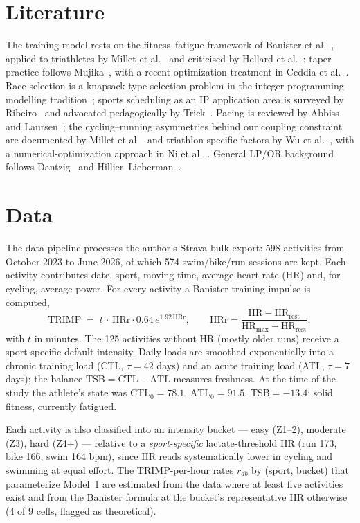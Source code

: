 \documentclass[11pt,a4paper]{article}
\begin{document}
\section{Literature}

The training model rests on the fitness--fatigue framework of Banister et
al.~\cite{banister1975}, applied to triathletes by Millet et al.~\cite{millet2002}
and criticised by Hellard et al.~\cite{hellard2006}; taper practice follows
Mujika~\cite{mujika2009}, with a recent optimization treatment in Ceddia et
al.~\cite{ceddia2025}. Race selection is a knapsack-type selection problem in
the integer-programming modelling tradition~\cite{nemhauser1988,williams2013};
sports scheduling as an IP application area is surveyed by
Ribeiro~\cite{ribeiro2012} and advocated pedagogically by Trick~\cite{trick2005}.
Pacing is reviewed by Abbiss and Laursen~\cite{abbiss2008}; the cycling--running
asymmetries behind our coupling constraint are documented by Millet et
al.~\cite{millet2009} and triathlon-specific factors by Wu et al.~\cite{wu2014},
with a numerical-optimization approach in Ni et al.~\cite{ni2022}. General LP/OR
background follows Dantzig~\cite{dantzig1963} and
Hillier--Lieberman~\cite{hillier2015}.

\section{Data}

The data pipeline processes the author's Strava bulk export: 598 activities from
October 2023 to June 2026, of which 574 swim/bike/run sessions are kept. Each
activity contributes date, sport, moving time, average heart rate (HR) and, for
cycling, average power. For every activity a Banister training impulse is computed,
\[
\text{TRIMP} \;=\; t \,\cdot\, \text{HRr} \cdot 0.64\, e^{1.92\,\text{HRr}},
\qquad
\text{HRr} = \frac{\text{HR} - \text{HR}_{\text{rest}}}{\text{HR}_{\max} - \text{HR}_{\text{rest}}},
\]
with $t$ in minutes. The 125 activities without HR (mostly older runs) receive a
sport-specific default intensity. Daily loads are smoothed exponentially into a
chronic training load (CTL, $\tau = 42$ days) and an acute training load (ATL,
$\tau = 7$ days); the balance $\text{TSB} = \text{CTL} - \text{ATL}$ measures
freshness. At the time of the study the athlete's state was
$\text{CTL}_0 = 78.1$, $\text{ATL}_0 = 91.5$, $\text{TSB} = -13.4$: solid fitness,
currently fatigued.

Each activity is also classified into an intensity bucket --- easy (Z1--2), moderate
(Z3), hard (Z4+) --- relative to a \emph{sport-specific} lactate-threshold HR (run
173, bike 166, swim 164 bpm), since HR reads systematically lower in cycling and
swimming at equal effort. The TRIMP-per-hour rates $r_{db}$ by (sport, bucket) that
parameterize Model~1 are estimated from the data where at least five activities
exist and from the Banister formula at the bucket's representative HR otherwise
(4 of 9 cells, flagged as theoretical).
\end{document}
